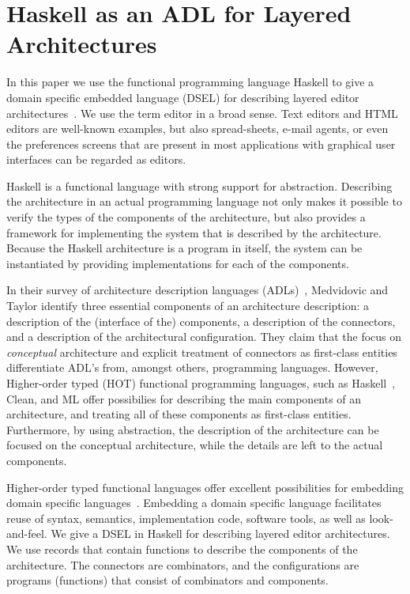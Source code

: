 \chapter{Haskell as an ADL for Layered Architectures} \label{chap:archCombs}



In this paper we use the functional programming language Haskell to give a domain specific embedded language (DSEL) for describing layered editor architectures~\cite{architecture}. We use the term editor in a broad sense. Text editors and HTML editors are well-known examples, but also spread-sheets, e-mail agents, or even the preferences screens that are present in most applications with graphical user interfaces can be regarded as editors.

 Haskell is a functional language with strong support for abstraction. Describing the architecture in an actual programming language not only makes it possible to verify the types of the components of the architecture, but also provides a framework for implementing the system that is described by the architecture. Because the Haskell architecture is a program in itself, the system can be instantiated by providing implementations for each of the components.

In their survey of architecture description languages (ADLs)~\cite{medvidovicTaylor}, Medvidovic and Taylor identify three essential components of an architecture description: a description of the (interface of the) components, a description of the connectors, and a description of the architectural configuration. They claim that the focus on {\em conceptual} architecture and explicit treatment of connectors as first-class entities differentiate ADL's from, amongst others, programming languages. However, Higher-order typed (HOT) functional programming languages, such as Haskell~\cite{haskel}, Clean, and ML offer possibilies for describing the main components of an architecture, and treating all of these components as first-class entities. Furthermore, by using abstraction, the description of the architecture can be focused on the conceptual architecture, while the details are left to the actual components.

Higher-order typed functional languages offer excellent possibilities for embedding domain specific languages~\cite{hudak}. Embedding a domain specific language facilitates reuse of syntax, semantics, implementation code, software tools, as well as look-and-feel. We give a DSEL in Haskell for describing layered editor architectures. We use records that contain functions to describe the components of the architecture. The connectors are combinators, and the configurations are programs (functions) that consist of combinators and components. 

